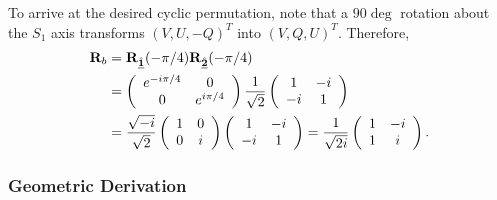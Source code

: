 %
To arrive at the desired cyclic permutation, note that a $90\deg$ rotation about the $S_1$ axis transforms 
$(V,U,-Q)^T$ 
into 
$(V,Q,U)^T.$
%
Therefore,
%
\begin{align}
\JM{R}_b 
  &= \vRotation[1](-\pi/4) \vRotation[2](-\pi/4) \\
  &= 
  \left( \begin{array}{cc}
    e^{-\Ci\pi/4} & 0 \\
    0 & e^{\Ci\pi/4}
  \end{array} \right)
  \frac{1}{\sqrt{2}}
  \left( \begin{array}{cc}
    1 & -\Ci \\
    -\Ci & 1
  \end{array} \right) \nonumber \\
  &=   \frac{\sqrt{-\Ci}}{\sqrt{2}}
  \left( \begin{array}{cc}
    1 & 0 \\
    0 & \Ci
  \end{array} \right)
  \left( \begin{array}{cc}
    1 & -\Ci \\
    -\Ci & 1
  \end{array} \right) 
  =   \frac{1}{\sqrt{2i}}
  \left( \begin{array}{cc}
    1 & -\Ci \\
    1 & \Ci
  \end{array} \right). \nonumber
\end{align}

\subsubsection{Geometric Derivation}

